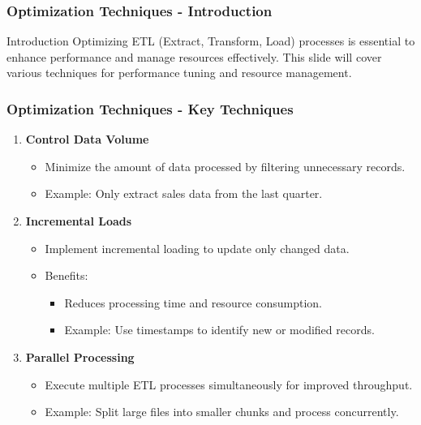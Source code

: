 \documentclass{beamer}
\begin{document}
\begin{frame}[fragile]
    \frametitle{Optimization Techniques - Introduction}
    \begin{block}{Introduction}
        Optimizing ETL (Extract, Transform, Load) processes is essential to enhance performance and manage resources effectively. This slide will cover various techniques for performance tuning and resource management.
    \end{block}
\end{frame}

\begin{frame}[fragile]
    \frametitle{Optimization Techniques - Key Techniques}
    \begin{enumerate}
        \item \textbf{Control Data Volume}
        \begin{itemize}
            \item Minimize the amount of data processed by filtering unnecessary records.
            \item Example: Only extract sales data from the last quarter.
        \end{itemize}
        
        \item \textbf{Incremental Loads}
        \begin{itemize}
            \item Implement incremental loading to update only changed data.
            \item Benefits:
            \begin{itemize}
                \item Reduces processing time and resource consumption.
                \item Example: Use timestamps to identify new or modified records.
            \end{itemize}
        \end{itemize}
        
        \item \textbf{Parallel Processing}
        \begin{itemize}
            \item Execute multiple ETL processes simultaneously for improved throughput.
            \item Example: Split large files into smaller chunks and process concurrently.
        \end{itemize}
    \end{enumerate}
\end{frame}
\end{document}
